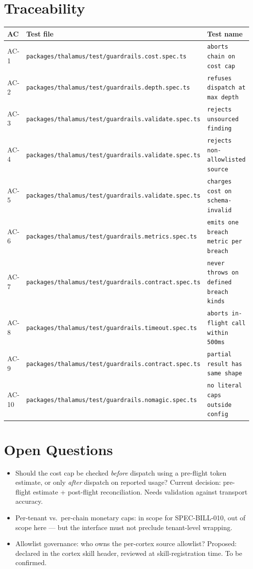 \section{Traceability}

\begin{center}
\begin{tabular}{@{}lll@{}}
\toprule
AC & Test file & Test name \\
\midrule
AC-1  & \texttt{packages/thalamus/test/guardrails.cost.spec.ts}      & \texttt{aborts chain on cost cap} \\
AC-2  & \texttt{packages/thalamus/test/guardrails.depth.spec.ts}     & \texttt{refuses dispatch at max depth} \\
AC-3  & \texttt{packages/thalamus/test/guardrails.validate.spec.ts}  & \texttt{rejects unsourced finding} \\
AC-4  & \texttt{packages/thalamus/test/guardrails.validate.spec.ts}  & \texttt{rejects non-allowlisted source} \\
AC-5  & \texttt{packages/thalamus/test/guardrails.validate.spec.ts}  & \texttt{charges cost on schema-invalid} \\
AC-6  & \texttt{packages/thalamus/test/guardrails.metrics.spec.ts}   & \texttt{emits one breach metric per breach} \\
AC-7  & \texttt{packages/thalamus/test/guardrails.contract.spec.ts}  & \texttt{never throws on defined breach kinds} \\
AC-8  & \texttt{packages/thalamus/test/guardrails.timeout.spec.ts}   & \texttt{aborts in-flight call within 500ms} \\
AC-9  & \texttt{packages/thalamus/test/guardrails.contract.spec.ts}  & \texttt{partial result has same shape} \\
AC-10 & \texttt{packages/thalamus/test/guardrails.nomagic.spec.ts}   & \texttt{no literal caps outside config} \\
\bottomrule
\end{tabular}
\end{center}

\section{Open Questions}
\begin{itemize}[leftmargin=1.2em]
  \item Should the cost cap be checked \emph{before} dispatch using a pre-flight token estimate, or only \emph{after} dispatch on reported usage? Current decision: pre-flight estimate + post-flight reconciliation. Needs validation against transport accuracy.
  \item Per-tenant vs.\ per-chain monetary caps: in scope for SPEC-BILL-010, out of scope here --- but the interface must not preclude tenant-level wrapping.
  \item Allowlist governance: who owns the per-cortex source allowlist? Proposed: declared in the cortex skill header, reviewed at skill-registration time. To be confirmed.
\end{itemize}


